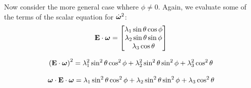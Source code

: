 \documentclass[extra,mreferee]{gji}
\begin{document}
Now consider the more general case whhere $\phi \ne 0$.
Again, we evaluate some of the terms of the scalar equation for $\dot{\mitbf{\omega}}^2$:
\begin{equation}
\mathbf{E}\cdot \mitbf{\omega} = 
\begin{bmatrix}
\lambda_1 \sin{\theta} \cos{\phi}\\
\lambda_2 \sin{\theta} \sin{\phi} \\
\lambda_3 \cos{\theta}
\end{bmatrix}
\end{equation}

\begin{equation}
\left(\mathbf{E}\cdot \mitbf{\omega}\right)^2 = \lambda_1^2 \sin^2{\theta} \cos^2{\phi} + \lambda_2^2 \sin^2{\theta} \sin^2{\phi} + \lambda_3^2 \cos^2{\theta}
\end{equation}

\begin{equation}
\mitbf{\omega} \cdot \mathbf{E} \cdot \mitbf{\omega} = 
\lambda_1 \sin^2{\theta} \cos^2{\phi} + \lambda_2 \sin^2{\theta} \sin^2{\phi} + \lambda_3 \cos^2{\theta}
\end{equation}
\end{document}
